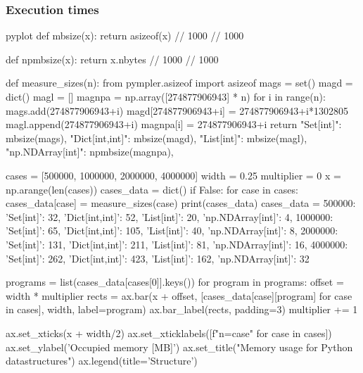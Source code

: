 
\begin{frame}[fragile]
  \frametitle{Execution times}

  \begin{CacheMeCode}{pyplot}
      def mbsize(x):
          return asizeof(x) // 1000 // 1000

      def npmbsize(x):
          return x.nbytes // 1000 // 1000

      def measure_sizes(n):
          from pympler.asizeof import asizeof
          mags = set()
          magd = dict()
          magl = []
          magnpa = np.array([274877906943] * n)
          for i in range(n):
              mags.add(274877906943+i)
              magd[274877906943+i] = 274877906943+i*1302805
              magl.append(274877906943+i)
              magnpa[i] = 274877906943+i
          return {
              "Set[int]": mbsize(mags),
              "Dict[int,int]": mbsize(magd),
              "List[int]": mbsize(magl),
              "np.NDArray[int]": npmbsize(magnpa),
          }

      cases = [500000, 1000000, 2000000, 4000000]
      width = 0.25
      multiplier = 0
      x = np.arange(len(cases))
      cases_data = dict()
      if False:
          for case in cases:
            cases_data[case] = measure_sizes(case)
          print(cases_data)
      cases_data = {500000: {'Set[int]': 32, 'Dict[int,int]': 52, 'List[int]': 20, 'np.NDArray[int]': 4}, 1000000: {'Set[int]': 65, 'Dict[int,int]': 105, 'List[int]': 40, 'np.NDArray[int]': 8}, 2000000: {'Set[int]': 131, 'Dict[int,int]': 211, 'List[int]': 81, 'np.NDArray[int]': 16}, 4000000: {'Set[int]': 262, 'Dict[int,int]': 423, 'List[int]': 162, 'np.NDArray[int]': 32}}

      programs = list(cases_data[cases[0]].keys())
      for program in programs:
        offset = width * multiplier
        rects = ax.bar(x + offset, [cases_data[case][program] for case in cases], width, label=program)
        ax.bar_label(rects, padding=3)
        multiplier += 1

      ax.set_xticks(x + width/2)
      ax.set_xticklabels([f"n={case}" for case in cases])
      ax.set_ylabel('Occupied memory [MB]')
      ax.set_title("Memory usage for Python datastructures")
      ax.legend(title='Structure')
  \end{CacheMeCode}
\end{frame}

